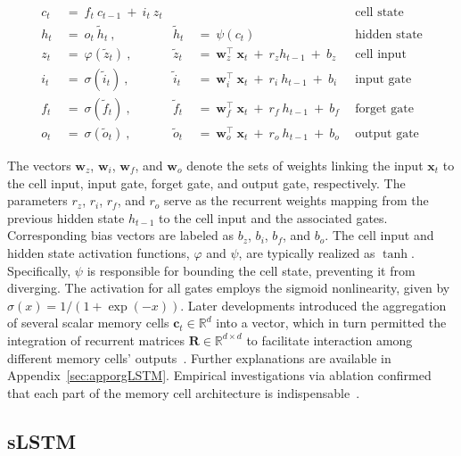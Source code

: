 \begin{align}
c_t \ &= \  f_t \ c_{t-1} \ + \ i_t \ z_t &  & &\text{cell state} \\
h_t  \ &= \ o_t \ \tilde{h}_t \ , & \tilde{h}_t \ &= \ \psi \left( c_t\right)
  &\text{hidden state} \\
z_t \ &= \ \varphi \left( \tilde{z}_t \right) \ , 
  &\tilde{z}_t \ &=  \ \mathbf{w}^\top_{z} \ \mathbf{x}_t \ + \
  r_{z}  h_{t-1} \ + \  b_{z} \ \
  &\text{cell input} \\
i_t \ &= \ \sigma \left( \tilde{i}_t  \right) \ , 
  &\tilde{i}_t \ &= \ \mathbf{w}^\top_{i} \ \mathbf{x}_t \ + \
  r_{i}  \ h_{t-1} \ + \  b_{i} \ \
  &\text{input gate} \\
f_t \ &= \ \sigma \left(  \tilde{f}_t \right) \ , 
  &\tilde{f}_t \ &= \ \mathbf{w}^\top_{f} \ \mathbf{x}_t  \ + \
  r_{f}  \ h_{t-1} \ + \  b_{f} \ \
  &\text{forget gate} \\
o_t \ &= \ \sigma \left( \tilde{o}_t \right) \ , 
  &\tilde{o}_t  \ &= \ \mathbf{w}^\top_{o} \ \mathbf{x}_t \ + \
  r_{o}  \ h_{t-1} \ + \  b_{o} \ \
  &\text{output gate} 
\end{align}

The vectors $\mathbf{w}_{z}$, $\mathbf{w}_{i}$, $\mathbf{w}_{f}$, and $\mathbf{w}_{o}$ denote the sets of weights linking the input $\mathbf{x}_t$ to the cell input, input gate, forget gate, and output gate, respectively. The parameters $r_{z}$, $r_{i}$, $r_{f}$, and $r_{o}$ serve as the recurrent weights mapping from the previous hidden state $h_{t-1}$ to the cell input and the associated gates. Corresponding bias vectors are labeled as $b_{z}$, $b_{i}$, $b_{f}$, and $b_{o}$. The cell input and hidden state activation functions, $\varphi$ and $\psi$, are typically realized as $\tanh$. Specifically, $\psi$ is responsible for bounding the cell state, preventing it from diverging. The activation for all gates employs the sigmoid nonlinearity, given by $\sigma \left( x \right) = 1/(1+\exp(-x))$. Later developments introduced the aggregation of several scalar memory cells $\mathbf{c}_t \in \mathbb{R}^{d}$ into a vector, which in turn permitted the integration of recurrent matrices $\mathbf{R} \in \mathbb{R}^{d \times d}$ to facilitate interaction among different memory cells’ outputs~\citep{Greff:15}. Further explanations are available in Appendix~\ref{sec:apporgLSTM}. Empirical investigations via ablation confirmed that each part of the memory cell architecture is indispensable~\citep{Greff:15}.

\subsection{sLSTM}
\label{sec:sLSTM}

